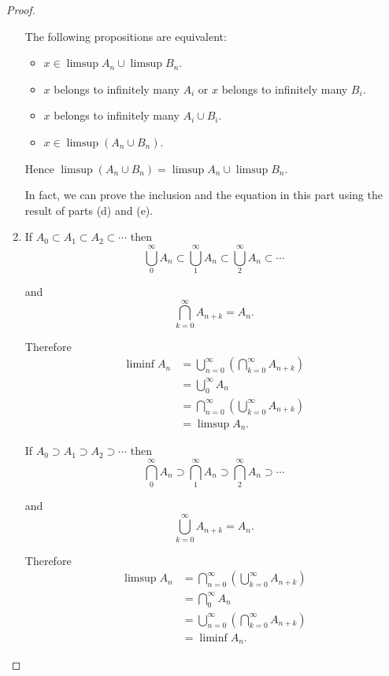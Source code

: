 \begin{proof}
\begin{enumerate}[label={(\alph*)}, leftmargin=*]
		      The following propositions are equivalent:
		      \begin{itemize}[leftmargin=*]
			      \item \( x \in \limsup A_{n} \cup \limsup B_{n} \).
			      \item \( x \) belongs to infinitely many \( A_{i} \) or \( x \) belongs to infinitely many \( B_{i} \).
			      \item \( x \) belongs to infinitely many \( A_{i} \cup B_{i} \).
			      \item \( x \in \limsup (A_{n} \cup B_{n}) \).
		      \end{itemize}

		      Hence \( \limsup (A_{n} \cup B_{n}) = \limsup A_{n} \cup \limsup B_{n} \).

		      In fact, we can prove the inclusion and the equation in this part using the result of parts (d) and (e).
		\item If \( A_{0} \subset A_{1} \subset A_{2} \subset \cdots \) then
		      \[
			      \bigcup^{\infty}_{0} A_{n} \subset \bigcup^{\infty}_{1} A_{n} \subset \bigcup^{\infty}_{2} A_{n} \subset \cdots
		      \]

		      and
		      \[
			      \bigcap^{\infty}_{k=0} A_{n+k} = A_{n}.
		      \]

		      Therefore
		      \begingroup
		      \allowdisplaybreaks%
		      \begin{align*}
			      \liminf A_{n} & = \bigcup^{\infty}_{n=0}\left(\bigcap^{\infty}_{k=0} A_{n+k}\right) \\
			                    & = \bigcup^{\infty}_{0} A_{n}                                        \\
			                    & = \bigcap^{\infty}_{n=0}\left(\bigcup^{\infty}_{k=0} A_{n+k}\right) \\
			                    & = \limsup A_{n}.
		      \end{align*}
		      \endgroup

		      If \( A_{0} \supset A_{1} \supset A_{2} \supset \cdots \) then
		      \[
			      \bigcap^{\infty}_{0} A_{n} \supset \bigcap^{\infty}_{1} A_{n} \supset \bigcap^{\infty}_{2} A_{n} \supset \cdots
		      \]

		      and
		      \[
			      \bigcup^{\infty}_{k=0} A_{n+k} = A_{n}.
		      \]

		      Therefore
		      \begingroup
		      \allowdisplaybreaks%
		      \begin{align*}
			      \limsup A_{n} & = \bigcap^{\infty}_{n=0}\left(\bigcup^{\infty}_{k=0} A_{n+k}\right) \\
			                    & = \bigcap^{\infty}_{0} A_{n}                                        \\
			                    & = \bigcup^{\infty}_{n=0}\left(\bigcap^{\infty}_{k=0} A_{n+k}\right) \\
			                    & = \liminf A_{n}.
		      \end{align*}
		      \endgroup


\end{enumerate}
\end{proof}

